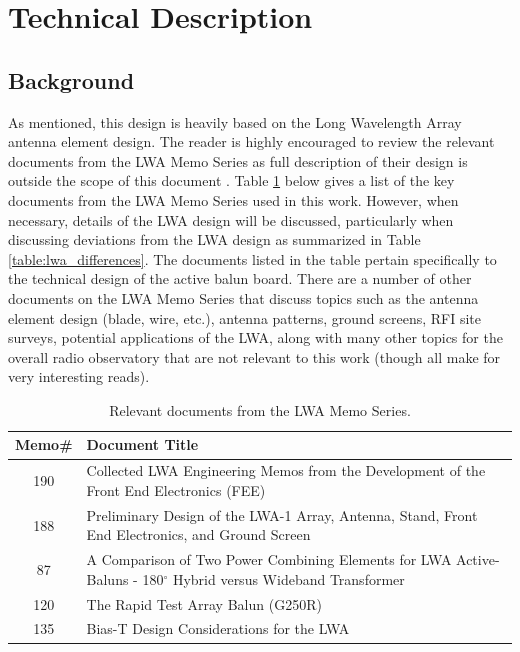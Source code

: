 \section{Technical Description}

\label{sec:technical_description}

\subsection{Background}
\label{subsec:technical:background}
As mentioned, this design is heavily based on the Long Wavelength Array antenna element design.
The reader is highly encouraged to review the relevant documents from the LWA Memo Series as full description of their design is outside the scope of this document \cite{lwa_memo}.
Table \ref{table:lwa_relevant_docs} below gives a list of the key documents from the LWA Memo Series used in this work.
However, when necessary, details of the LWA design will be discussed, particularly when discussing deviations from the LWA design as summarized in Table \ref{table:lwa_differences}.
The documents listed in the table pertain specifically to the technical design of the active balun board.
There are a number of other documents on the LWA Memo Series \cite{lwa_memo} that discuss topics such as the antenna element design (blade, wire, etc.), antenna patterns, ground screens, RFI site surveys, potential applications of the LWA, along with many other topics for the overall radio observatory that are not relevant to this work (though all make for very interesting reads).

\begin{table}[h]
\begin{center}
\caption{Relevant documents from the LWA Memo Series.}
\label{table:lwa_relevant_docs}
\begin{tabular}{|c|p{15cm}|}
	\hline
	\textbf{Memo\#} & \textbf{Document Title} \\
	\hline
	190 & Collected LWA Engineering Memos from the Development of the Front End Electronics (FEE) \cite{lwa_memo_190} \\
	\hline
    188 & Preliminary Design of the LWA-1 Array, Antenna, Stand, Front End Electronics, and Ground Screen \cite{lwa_memo_188} \\
	\hline
	87 & A Comparison of Two Power Combining Elements for LWA Active-Baluns -  180$^{\circ}$  Hybrid versus Wideband Transformer \cite{lwa_memo_87}\\
	\hline
	120 & The Rapid Test Array Balun (G250R) \cite{lwa_memo_120} \\
	\hline
	135 & Bias-T Design Considerations for the LWA \cite{lwa_memo_135}\\
	\hline
\end{tabular}
\end{center}
\end{table}

